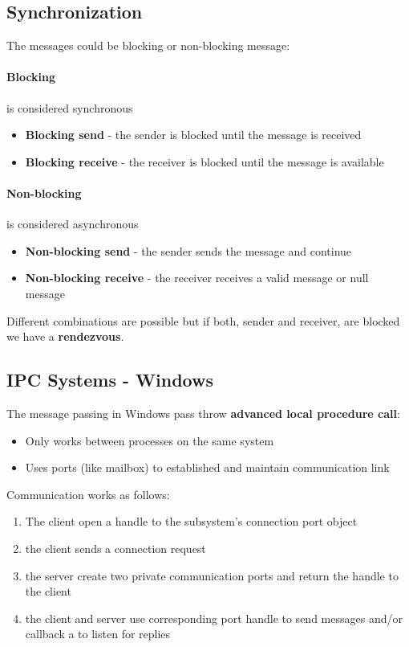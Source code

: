 \newpage
\subsection{Synchronization}
The messages could be blocking or non-blocking message:


\paragraph{Blocking} is considered synchronous
\begin{itemize}
    \item \textbf{Blocking send} - the sender is blocked until the message is received
    \item \textbf{Blocking receive} - the receiver is blocked until the message is available
\end{itemize}

\paragraph{Non-blocking} is considered asynchronous
\begin{itemize}
    \item \textbf{Non-blocking send} - the sender sends the message and continue
    \item \textbf{Non-blocking receive} - the receiver receives a valid message or null message
\end{itemize}

Different combinations are possible but if both, sender and receiver, are blocked we have a \textbf{rendezvous}.

\subsection{IPC Systems - Windows}

The message passing in Windows pass throw \textbf{advanced local procedure call}: 
\begin{itemize}
    \item Only works between processes on the same system
    \item Uses ports (like mailbox) to established and maintain communication link
\end{itemize}

Communication works as follows:

\begin{enumerate}
    \item The client open a handle to the subsystem's connection port object
    \item the client sends a connection request
    \item the server create two private communication ports and return the handle to the client
    \item the client and server use corresponding port handle to send messages and/or callback a to listen for replies
\end{enumerate}


